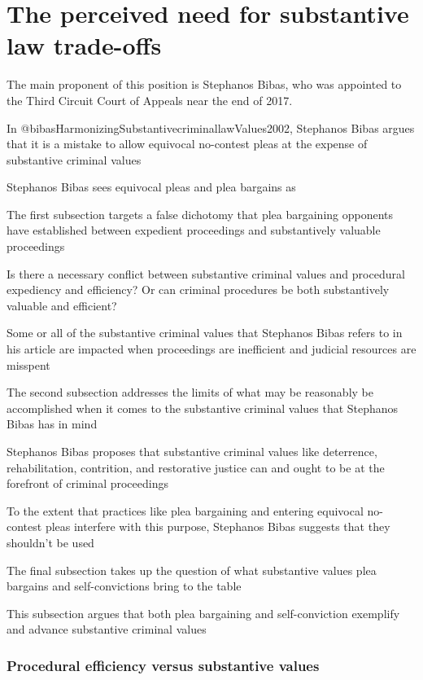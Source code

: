 \section{The perceived need for substantive law trade-offs}

The main proponent of this position is Stephanos Bibas, who was appointed to the Third Circuit Court of Appeals near the end of 2017.

In @bibasHarmonizingSubstantivecriminallawValues2002, Stephanos Bibas argues that it is a mistake to allow equivocal no-contest pleas at the expense of substantive criminal values

Stephanos Bibas sees equivocal pleas and plea bargains as

The first subsection targets a false dichotomy that plea bargaining opponents have established between expedient proceedings and substantively valuable proceedings

Is there a necessary conflict between substantive criminal values and procedural expediency and efficiency? Or can criminal procedures be both substantively valuable and efficient?

Some or all of the substantive criminal values that Stephanos Bibas refers to in his article are impacted when proceedings are inefficient and judicial resources are misspent

The second subsection addresses the limits of what may be reasonably be accomplished when it comes to the substantive criminal values that Stephanos Bibas has in mind

Stephanos Bibas proposes that substantive criminal values like deterrence, rehabilitation, contrition, and restorative justice can and ought to be at the forefront of criminal proceedings

To the extent that practices like plea bargaining and entering equivocal no-contest pleas interfere with this purpose, Stephanos Bibas suggests that they shouldn't be used

The final subsection takes up the question of what substantive values plea bargains and self-convictions bring to the table

This subsection argues that both plea bargaining and self-conviction exemplify and advance substantive criminal values

\subsubsection{Procedural efficiency versus substantive values}

